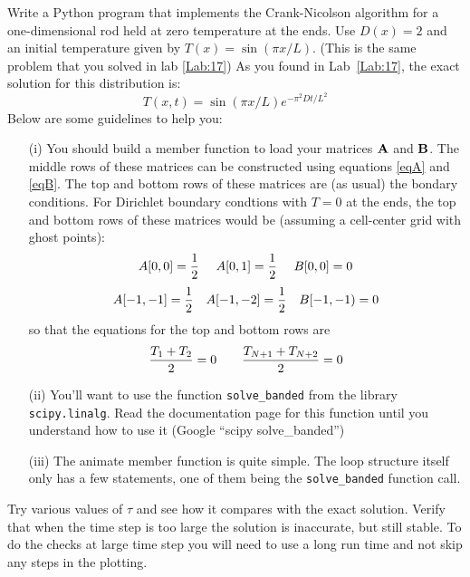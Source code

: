 {\begin{enumerate}
\probtwo \label{P:18.3}
\begin{enumerate}
  \subprob Write a Python program that implements the Crank-Nicolson
  algorithm for a one-dimensional rod held at zero temperature at the
  ends.  Use $D(x)=2$ and an initial temperature given by
  $T(x)=\sin{(\pi x/L)}$. (This is the same problem that you solved in
  lab \ref{Lab:17}) As you found in Lab~\ref{Lab:17}, the exact
  solution for this distribution is:
    \begin{equation}
        T(x,t)=\sin{(\pi x/L)} e^{-\pi^2 D t /L^2}
    \end{equation}
Below are some guidelines to help you:
\begin{enumerate}
\item[(i)] You should build a member function to load your matrices
  ${\bf A}$ and ${\bf B}$. The middle rows of these matrices can be
  constructed using equations \eqref{eqA} and \eqref{eqB}.  The top
  and bottom rows of these matrices are (as usual) the bondary
  conditions.  For Dirichlet boundary condtions with $T=0$ at the
  ends, the top and bottom rows of these matrices would be (assuming a
  cell-center grid with ghost points):
    \begin{equation}
        A[0,0]={1 \over 2}~~~~
        A[0,1]={1 \over 2}~~~~B[0,0]=0
    \end{equation}
    \begin{equation}
        A[-1,-1]={1 \over 2}~~~
        A[-1,-2]={1 \over 2}~~~
        B[-1,-1)=0
    \end{equation}
    so that the equations for the top and bottom rows are
    \begin{equation}
        {T_1 + T_2 \over 2} = 0~~~~~~
        {T_{N+1}+T_{N+2} \over 2} = 0
    \end{equation}
\item[(ii)] You'll want to use the function \texttt{solve\_banded} from
  the library \texttt{scipy.linalg}. Read the documentation page for
  this function until you understand how to use it (Google ``scipy
  solve\_banded'')
\item[(iii)]  The animate member function is quite simple.  The loop
  structure itself only has a few statements, one of them being the
  \texttt{solve\_banded} function call. 
\end{enumerate}
\subprob    Try various values of $\tau$ and see how it
    compares with the exact solution. Verify that when
    the time step is too large the solution is
    inaccurate, but still stable. To do the checks at
    large time step you will need to use a long run
    time and not skip any steps in the plotting.


\end{enumerate}
\end{enumerate}}
